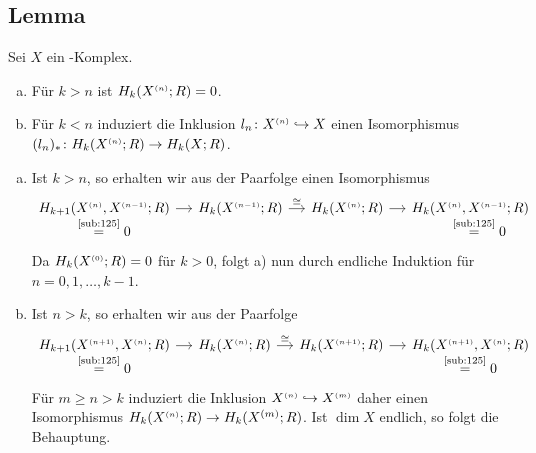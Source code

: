 \subsection[Lemma: Die Homologie des $n$-Gerüsts und die von $X^\ssbrace{n} \hookrightarrow X$ induzierte Abbildung]{Lemma} %
\label{sub:129}
Sei $X$ ein \CW-Komplex.
\begin{enumerate}[a)]
	\item Für $k >n$ ist $H_k(X^{\scriptscriptstyle(n)};R)=0$.
	\item Für $k <n$ induziert die Inklusion $l_n\colon X^{\scriptscriptstyle(n)} \hookrightarrow X$ einen Isomorphismus $(l_n)_* \colon H_k(X^{\scriptscriptstyle(n)};R) \to H_k(X;R)$.
\end{enumerate}
\begin{enumerate}[a)]
	\item Ist $k>n$, so erhalten wir aus der Paarfolge einen Isomorphismus
	\[
		\begin{tikzcd}[column sep=small]
			\underset{\textstyle\stackrel{\mbox{{\scriptsize\ref{sub:125}}}}{=} 0}{H_{k+1}\enbrace*{X^\ssbrace{n}, X^\ssbrace{n-1};R}} \rar &  H_k(X^\ssbrace{n-1};R) \rar["\cong"] & 
			H_k(X^\ssbrace{n};R) \rar 
			& H_k \underset{\textstyle\stackrel{\mbox{\scriptsize\ref{sub:125}}}{=}0}{\enbrace*{X^\ssbrace{n}, X^\ssbrace{n-1};R} }
		\end{tikzcd}
	\]
	Da $H_k(X^{{\scriptscriptstyle(0)}};R)=0$ für $k>0$, folgt a) nun durch endliche Induktion für $n=0,1, \ldots , k-1$.
	\item Ist $n >k$, so erhalten wir aus der Paarfolge
	\[
		\begin{tikzcd}[column sep=small]
			\underset{\textstyle\stackrel{\mbox{\scriptsize\ref{sub:125}}}{=}0}{H_{k+1} \enbrace*{X^\ssbrace{n+1},X^\ssbrace{n};R}} \rar & H_k \enbrace*{X^\ssbrace{n};R} \rar["\cong"] 
			& H_k \enbrace*{X^\ssbrace{n+1};R} \rar 
			& \underset{\textstyle\stackrel{\mbox{\scriptsize\ref{sub:125}}}{=}0}{H_k \enbrace*{X^\ssbrace{n+1},X^\ssbrace{n};R}   }
		\end{tikzcd}
	\]
	Für $m \ge n >k$ induziert die Inklusion $X^{\scriptscriptstyle(n)} \hookrightarrow X^{{\scriptscriptstyle(m)}}$ daher einen Isomorphismus $H_k(X^{\scriptscriptstyle(n)};R) \to H_k(X^{(m)};R)$. Ist $\dim X$ endlich, so folgt
	die Behauptung. 
	

\end{enumerate}
